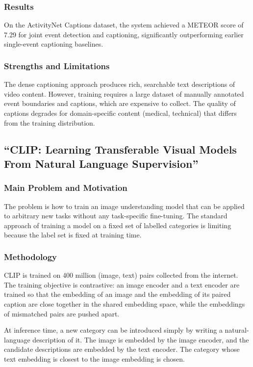 \documentclass[12pt, a4paper]{report}
\begin{document}
\subsubsection{Results}

On the ActivityNet Captions dataset, the system achieved a METEOR score
of 7.29 for joint event detection and captioning, significantly outperforming
earlier single-event captioning baselines.

\subsubsection{Strengths and Limitations}

The dense captioning approach produces rich, searchable text descriptions
of video content. However, training requires a large dataset of manually
annotated event boundaries and captions, which are expensive to collect.
The quality of captions degrades for domain-specific content (medical,
technical) that differs from the training distribution.

\subsection{``CLIP: Learning Transferable Visual Models From Natural Language
Supervision'' \cite{radford2021clip}}

\subsubsection{Main Problem and Motivation}

The problem is how to train an image understanding model that can be applied
to arbitrary new tasks without any task-specific fine-tuning. The standard
approach of training a model on a fixed set of labelled categories is limiting
because the label set is fixed at training time.

\subsubsection{Methodology}

CLIP is trained on 400 million (image, text) pairs collected from the internet.
The training objective is contrastive: an image encoder and a text encoder are
trained so that the embedding of an image and the embedding of its paired
caption are close together in the shared embedding space, while the embeddings
of mismatched pairs are pushed apart.

At inference time, a new category can be introduced simply by writing a natural-language
description of it. The image is embedded by the image encoder, and the
candidate descriptions are embedded by the text encoder. The category whose
text embedding is closest to the image embedding is chosen.
\end{document}
